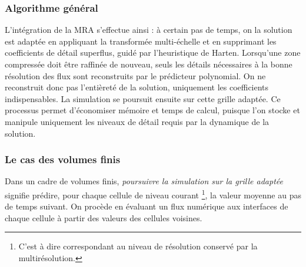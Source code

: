 \subsubsection{Algorithme général}
L'intégration de la MRA s'effectue ainsi : à certain pas de temps, on la solution est adaptée en appliquant la transformée multi-échelle et en supprimant les coefficients de détail superflus, guidé par l'heuristique de Harten. 
Lorsqu'une zone compressée doit être raffinée de nouveau, seuls les détails nécessaires à la bonne résolution des flux sont reconstruits par le prédicteur polynomial. 
On ne reconstruit donc pas l'entièreté de la solution, uniquement les coefficients indispensables. La simulation se poursuit ensuite sur cette grille adaptée.
Ce processus permet d'économiser mémoire et temps de calcul, puisque l'on stocke et manipule uniquement les niveaux de détail requis par la dynamique de la solution.
\subsubsection{Le cas des volumes finis}
Dans un cadre de volumes finis, \emph{poursuivre la simulation sur la grille adaptée} signifie prédire, pour chaque cellule de niveau courant
\footnote{C'est à dire correspondant au niveau de résolution conservé par la multirésolution.}, 
la valeur moyenne au pas de temps suivant. On procède en évaluant un flux numérique aux interfaces de chaque cellule à partir des valeurs des cellules voisines.


